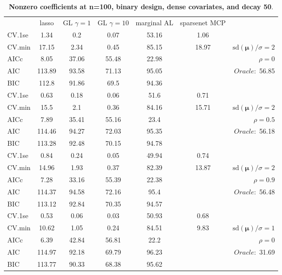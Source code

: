 \begin{table}\vspace{-.5cm}
\caption[l]{ { \bf Nonzero coefficients at n=100, binary design, 
dense covariates, and  decay  50}.}
\vspace{-.5cm}
\footnotesize{}
\begin{center}
\begin{tabular}{l*{5}{c}|r}
& lasso & GL $\gamma=1$ & GL $\gamma=10$ & marginal AL & sparsenet MCP  & \\
 \cline{1-7}
CV.1se & 1.34 & 0.2 & 0.07 & 53.16 & 1.06 & \\
CV.min & 17.15 & 2.34 & 0.45 & 85.15 & 18.97 &  $\mathrm{sd}(\mathbf{\mu})/\sigma=2$ \\
AICc & 8.05 & 37.06 & 55.48 & 22.98 & & $\rho=0$ \\
AIC & 113.89 & 93.58 & 71.13 & 95.05 & &  \multirow{2}{*}{$Oracle: $ 56.85} \\
BIC & 112.8 & 91.86 & 69.5 & 94.36 & &  \\
 \hline 
CV.1se & 0.63 & 0.18 & 0.06 & 51.6 & 0.71 & \\
CV.min & 15.5 & 2.1 & 0.36 & 84.16 & 15.71 &  $\mathrm{sd}(\mathbf{\mu})/\sigma=2$ \\
AICc & 7.89 & 35.41 & 55.16 & 23.4 & & $\rho=0.5$ \\
AIC & 114.46 & 94.27 & 72.03 & 95.35 & &  \multirow{2}{*}{$Oracle: $ 56.18} \\
BIC & 113.28 & 92.48 & 70.15 & 94.78 & &  \\
 \hline 
CV.1se & 0.84 & 0.24 & 0.05 & 49.94 & 0.74 & \\
CV.min & 14.96 & 1.93 & 0.37 & 82.39 & 13.87 &  $\mathrm{sd}(\mathbf{\mu})/\sigma=2$ \\
AICc & 7.28 & 33.16 & 55.39 & 22.38 & & $\rho=0.9$ \\
AIC & 114.37 & 94.58 & 72.16 & 95.4 & &  \multirow{2}{*}{$Oracle: $ 56.48} \\
BIC & 113.12 & 92.84 & 70.35 & 94.57 & &  \\
 \hline 
CV.1se & 0.53 & 0.06 & 0.03 & 50.93 & 0.68 & \\
CV.min & 10.62 & 1.05 & 0.24 & 84.51 & 9.83 &  $\mathrm{sd}(\mathbf{\mu})/\sigma=1$ \\
AICc & 6.39 & 42.84 & 56.81 & 22.2 & & $\rho=0$ \\
AIC & 114.97 & 92.18 & 69.79 & 96.23 & &  \multirow{2}{*}{$Oracle: $ 31.69} \\
BIC & 113.77 & 90.33 & 68.38 & 95.62 & &  \\

\end{tabular}
\end{center}
\end{table}
